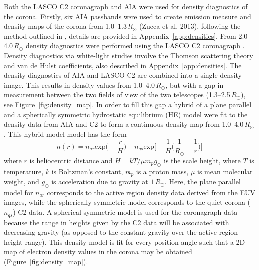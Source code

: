 Both the LASCO C2 coronagraph and AIA were used for density diagnostics of the corona. Firstly, six AIA passbands were used to create emission measure and density maps of the corona from 1.0--1.3\,$R_{\odot}$ (Zucca et al. 2013), following the method outlined in \citep{asch2013}, details are provided in Appendix~\ref{app:densities}. From 2.0--4.0\,$R_{\odot}$ density diagnostics were performed using the LASCO C2 coronagraph \citep{vdeh50}. Density diagnostics via white-light studies involve the Thomson scattering theory and van de Hulst coefficients, also described in Appendix~\ref{app:densities}. The density diagnostics of AIA and LASCO C2 are combined into a single density image. This results in density values from 1.0--4.0\,$R_{\odot}$, but with a gap in measurement between the two fields of view of the two telescopes (1.3--2.5\,$R_{\odot}$), see Figure~\ref{fig:density_map}. In order to fill this gap a hybrid of a plane parallel and a spherically symmetric hydrostatic equilibrium (HE) model were fit to the density data from AIA and C2 to form a continuous density map from 1.0--4.0\,$R_{\odot}$. This hybrid model model has the form
\begin{equation}
n(r) = n_{ar}\mathrm{exp}\bigg(-\frac{r}{H}\bigg) + n_{qs}\mathrm{exp}\bigg[-\frac{1}{H} \bigg(\frac{1}{R_{\odot}}-\frac{1}{r}\bigg)\bigg]
\label{eqn:hybrid_hydro}
\end{equation}
where $r$ is heliocentric distance and $H=kT/\mu m_pg_{\odot}$ is the scale height, where $T$ is temperature, $k$ is Boltzman's constant, $m_p$ is a proton mass, $\mu$ is mean molecular weight, and $g_{\odot}$ is acceleration due to gravity at $1\,R_{\odot}$. Here, the plane parallel model for $n_{ar}$ corresponds to the active region density data derived from the EUV images, while the spherically symmetric model corresponds to the quiet corona ($n_{qs}$) C2 data. A spherical symmetric model is used for the coronagraph data because the range in heights given by the C2 data will be associated with decreasing gravity (as opposed to the constant gravity over the active region height range). This density model is fit for every position angle such that a 2D map of electron density values in the corona may be obtained (Figure~\ref{fig:density_map}).

